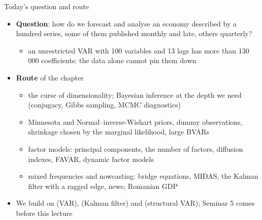 \begin{frame}{Today's question and route}
\itemsize{\small}
\begin{itemize}
    \item \textbf{Question}: how do we forecast and analyse an economy described by a hundred series, some of them published monthly and late, others quarterly?
    \begin{itemize}
        \item an unrestricted VAR with 100 variables and 13 lags has more than 130\,000 coefficients: the data alone cannot pin them down
    \end{itemize}
    \item \textbf{Route} of the chapter
    \begin{itemize}
        \item the curse of dimensionality; Bayesian inference at the depth we need (conjugacy, Gibbs sampling, MCMC diagnostics)
        \item Minnesota and Normal--inverse-Wishart priors, dummy observations, shrinkage chosen by the marginal likelihood, large BVARs
        \item factor models: principal components, the number of factors, diffusion indexes, FAVAR, dynamic factor models
        \item mixed frequencies and nowcasting: bridge equations, MIDAS, the Kalman filter with a ragged edge, news; Romanian GDP
    \end{itemize}
    \item We build on  (VAR),  (Kalman filter) and  (structural VAR); Seminar 5 comes before this lecture
\end{itemize}
\end{frame}

